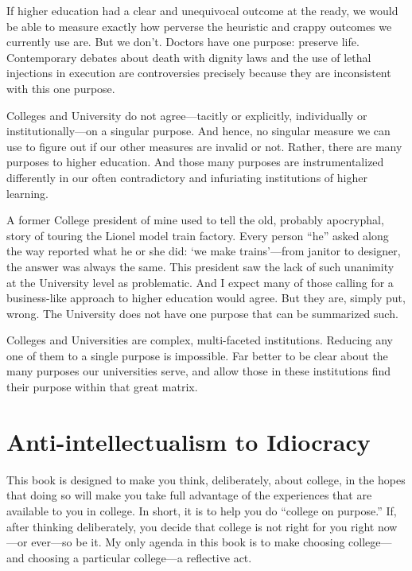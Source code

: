 If higher education had a clear and unequivocal outcome at the ready, we would be able to measure exactly how perverse the heuristic and crappy outcomes we currently use are. But we don't. Doctors have one purpose: preserve life. Contemporary debates about death with dignity laws and the use of lethal injections in execution are controversies precisely because they are inconsistent with this one purpose. 

Colleges and University do not agree---tacitly or explicitly, individually or institutionally---on a singular purpose. And hence, no singular measure we can use to figure out if our other measures are invalid or not. Rather, there are many purposes to higher education. And those many purposes are instrumentalized differently in our often contradictory and infuriating institutions of higher learning.

A former College president of mine used to tell the old, probably apocryphal, story of touring the Lionel model train factory. Every person ``he'' asked along the way reported what he or she did: `we make trains'---from janitor to designer, the answer was always the same. This president saw the lack of such unanimity at the University level as problematic. And I expect many of those calling for a business-like approach to higher education would agree. But they are, simply put, wrong. The University does not have one purpose that can be summarized such.

Colleges and Universities are complex, multi-faceted institutions. Reducing any one of them to a single purpose is impossible. Far better to be clear about the many purposes our universities serve, and allow those in these institutions find their purpose within that great matrix. 

\section{Anti-intellectualism to Idiocracy}
\label{anti-intellectualismtoidiocracy}

This book is designed to make you think, deliberately, about college, in the hopes that doing so will make you take full advantage of the experiences that are available to you in college. In short, it is to help you do ``college on purpose.'' If, after thinking deliberately, you decide that college is not right for you right now---or ever---so be it. My only agenda in this book is to make choosing college---and choosing a particular college---a reflective act.

